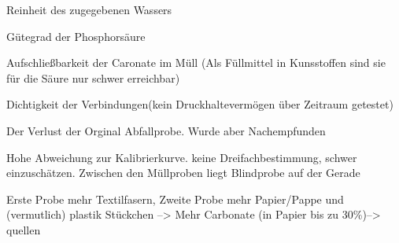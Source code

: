 Reinheit des zugegebenen Wassers

Gütegrad der Phosphorsäure

Aufschließbarkeit der Caronate im Müll (Als Füllmittel in Kunsstoffen sind sie für die Säure nur schwer erreichbar)

Dichtigkeit der Verbindungen(kein Druckhaltevermögen über Zeitraum getestet)

Der Verlust der Orginal Abfallprobe. Wurde aber Nachempfunden

Hohe Abweichung zur Kalibrierkurve. keine Dreifachbestimmung, schwer einzuschätzen. Zwischen den Müllproben liegt Blindprobe auf der Gerade

Erste Probe mehr Textilfasern, Zweite Probe mehr Papier/Pappe und (vermutlich) plastik Stückchen --> Mehr Carbonate (in Papier bis zu 30\%)--> quellen



